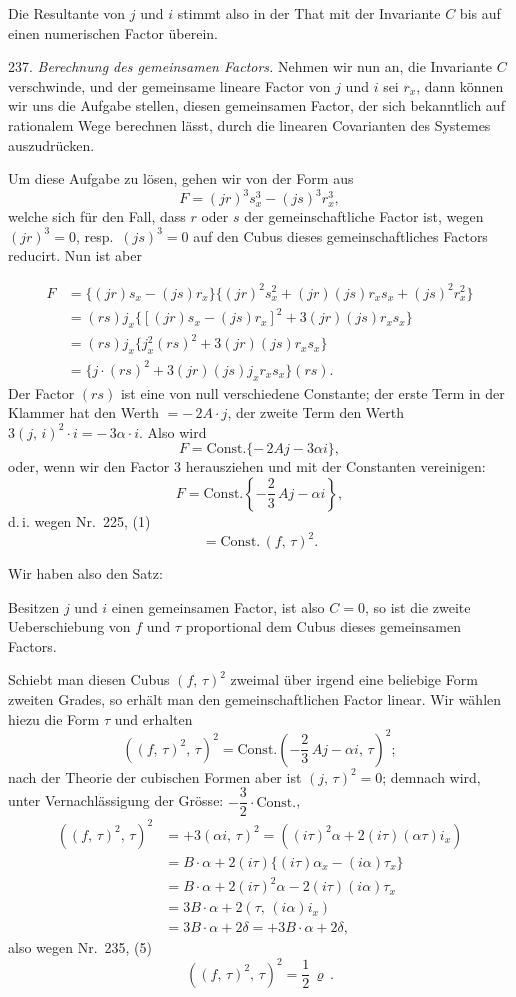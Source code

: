 \documentclass[11pt]{article}
\providecommand{\weberpage}[1]{}
\begin{document}
Die Resultante von $j$ und $i$ stimmt also in der That mit der
Invariante $C$ bis auf einen numerischen Factor überein.

237. \textit{Berechnung des gemeinsamen Factors.} Nehmen wir nun an,
die Invariante $C$ verschwinde, und der gemeinsame lineare Factor von
$j$ und $i$ sei $r_x$, dann k\"onnen wir uns die Aufgabe stellen, diesen gemeinsamen
 Factor, der sich bekanntlich auf rationalem Wege berechnen
 l\"asst, durch die linearen Covarianten des Systemes auszudr\"ucken.

Um diese Aufgabe zu l\"osen, gehen wir von der Form aus
\[
F = (jr)^3 s_x^3 - (js)^3 r_x^3,
\]
welche sich f\"ur den Fall, dass $r$ oder $s$ der gemeinschaftliche Factor
ist, wegen $(jr)^3=0$, resp.\ $(js)^3=0$ auf den Cubus dieses gemeinschaftliches
 Factors reducirt. Nun ist aber


\weberpage{262}
\[
\begin{aligned}
F &= \{(jr)s_x-(js)r_x\}\{(jr)^2s_x^2+(jr)(js)r_xs_x+(js)^2r_x^2\} \\
&= (rs)j_x\{[(jr)s_x-(js)r_x]^2+3(jr)(js)r_xs_x\} \\
&= (rs)j_x\{j_x^2(rs)^2+3(jr)(js)r_xs_x\} \\
&= \{j\cdot(rs)^2+3(jr)(js)j_xr_xs_x\}(rs).
\end{aligned}
\]
Der Factor $(rs)$ ist eine von null verschiedene Constante; der
erste Term in der Klammer hat den Werth $=-\,2A\cdot j$, der zweite
Term den Werth $3(j,\,i)^2\cdot i=-\,3\alpha\cdot i$. Also wird
\[
F = \text{Const.}\{-\,2Aj-3\alpha i\},
\]
oder, wenn wir den Factor 3 herausziehen und mit der Constanten
vereinigen:
\[
F = \text{Const.}\left\{-\frac{2}{3}\,Aj-\alpha i\right\},
\]
d.\,i. wegen Nr.\ 225, (1)
\[
= \text{Const.}\,(f,\,\tau)^2.
\]

Wir haben also den Satz:

\glqq Besitzen $j$ und $i$ einen gemeinsamen Factor, ist also $C=0$,
so ist die zweite Ueberschiebung von $f$ und $\tau$ proportional
dem Cubus dieses gemeinsamen Factors.\grqq{}

Schiebt man diesen Cubus $(f,\,\tau)^2$ zweimal \"uber irgend eine beliebige
 Form zweiten Grades, so erh\"alt man den gemeinschaftlichen
Factor linear. Wir w\"ahlen hiezu die Form $\tau$ und erhalten
\[
((f,\,\tau)^2,\,\tau)^2 = \text{Const.}\left(-\frac{2}{3}\,Aj-\alpha i,\,\tau\right)^2;
\]
nach der Theorie der cubischen Formen aber ist $(j,\,\tau)^2=0$; demnach
wird, unter Vernachl\"assigung der Gr\"osse: $-\dfrac{3}{2}\cdot\text{Const.}$,
\[
\begin{aligned}
((f,\,\tau)^2,\,\tau)^2 &= +3(\alpha i,\,\tau)^2 = ((i\tau)^2\alpha+2(i\tau)(\alpha\tau)i_x) \\
&= B\cdot\alpha+2(i\tau)\{(i\tau)\alpha_x-(i\alpha)\tau_x\} \\
&= B\cdot\alpha+2(i\tau)^2\alpha-2(i\tau)(i\alpha)\tau_x \\
&= 3B\cdot\alpha+2(\tau,\,(i\alpha)i_x) \\
&= 3B\cdot\alpha+2\delta = +3B\cdot\alpha+2\delta,
\end{aligned}
\]
also wegen Nr.\ 235, (5)
\[
((f,\,\tau)^2,\,\tau)^2 = \frac{1}{2}\,\varrho\,.
\]
\end{document}

